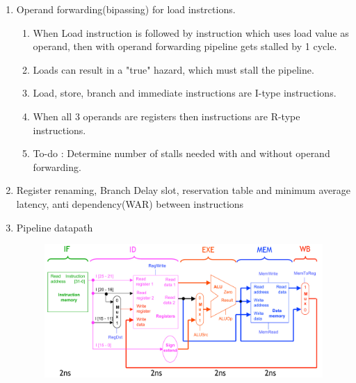 \begin{enumerate}
    \newpage

    \item Operand forwarding(bipassing) for load instrctions.
    \begin{enumerate}
        \item When Load instruction is followed by instruction which uses load value as operand, then
              with operand forwarding pipeline gets stalled by 1 cycle.
        \item Loads can result in a "true" hazard, which must stall the pipeline.
        \item Load, store, branch and immediate instructions are I-type instructions.
        \item When all 3 operands are registers then instructions are R-type instructions.
        \item To-do : Determine number of stalls needed with and without operand forwarding.
    \end{enumerate}

    \item Register renaming, Branch Delay slot, reservation table and minimum average latency,
          anti dependency(WAR) between instructions

    \item Pipeline datapath \\
        \begin{figure}[h]
            \centering   \includegraphics[scale=0.5]{./images/pipeline_datapath.jpeg}
        \end{figure}

\end{enumerate}
